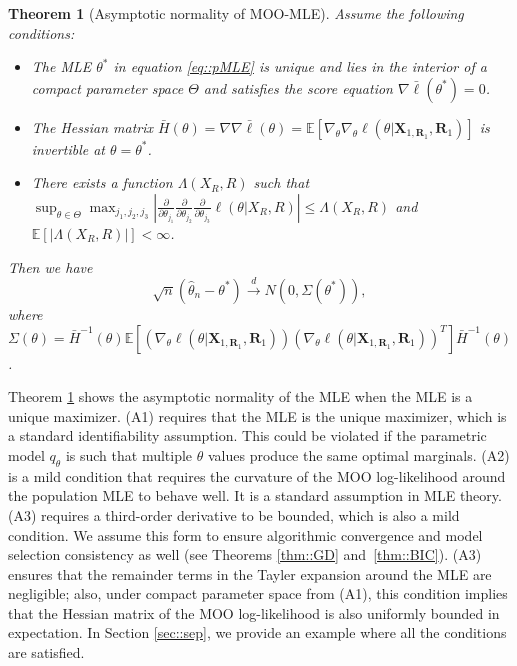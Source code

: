 \documentclass[aos, preprint]{imsart}
\theoremstyle{plain}
\newtheorem{theorem}{Theorem}[section]
\theoremstyle{definition}
\let\hat\widehat
\newcommand{\E}{\mbox{$\mathbb{E}$}}
\newcommand{\bX}{\mathbf{X}}
\newcommand{\bR}{\mathbf{R}}
\begin{document}
\begin{theorem}[Asymptotic normality of MOO-MLE]
Assume the following conditions:
\begin{itemize}
\item[(A1)] The MLE $\theta^*$ in equation \eqref{eq::pMLE} is unique and lies in the interior of a compact parameter space $\Theta$
and satisfies the score equation $ \nabla \bar \ell(\theta^*) = 0$. 
\item[(A2)] The Hessian matrix $\bar H(\theta) = \nabla\nabla \bar \ell(\theta)  = \E[\nabla_\theta\nabla_\theta\ell(\theta|\bX_{1,\bR_1},\bR_1)]$ is invertible at $\theta = \theta^*$.
\item[(A3)] There exists a function $\Lambda(X_R, R)$ such that  $\sup_{\theta\in\Theta}\max_{j_1,j_2,j_3}\left|\frac{\partial}{\partial \theta_{j_1}} \frac{\partial}{\partial \theta_{j_2}} \frac{\partial}{\partial \theta_{j_3}}\ell(\theta|X_R,R)\right|\leq \Lambda(X_R, R)$ and $\E[|\Lambda(X_R, R)|]<\infty$. 
\end{itemize}
Then we have 
$$
\sqrt{n}(\hat \theta_n - \theta^*) \overset{d}{\rightarrow} N(0, \Sigma(\theta^*)),
$$
where $\Sigma(\theta)  = \bar H^{-1}(\theta)\E\left[(\nabla_\theta \ell(\theta|\bX_{1,\bR_1},\bR_1) )(\nabla_\theta \ell(\theta|\bX_{1,\bR_1},\bR_1) )^T\right]\bar H^{-1}(\theta)$.
\label{thm::MLE}
\end{theorem}
Theorem \ref{thm::MLE} shows the asymptotic normality of the MLE when the MLE is a unique maximizer. 
(A1) requires that the MLE is the unique maximizer, 
which is a standard identifiability assumption. This could be violated if the parametric model $q_\theta$ is such that multiple $\theta$ values produce the same optimal marginals.
(A2) is a mild condition that requires the curvature of the MOO log-likelihood around the population MLE
to behave well. It is a standard assumption in MLE theory. 
(A3) requires a third-order derivative to be bounded, which is also a mild condition.
We assume this form to ensure algorithmic convergence and model selection consistency as well (see Theorems \ref{thm::GD} and~\ref{thm::BIC}).
(A3) ensures that the remainder terms in the Tayler expansion
around the MLE are negligible; also, under compact parameter space from (A1), this condition implies that the Hessian matrix
of the MOO log-likelihood is also
uniformly bounded in expectation. 
In Section \ref{sec::sep}, we provide an example where all the conditions are satisfied. 
\end{document}
